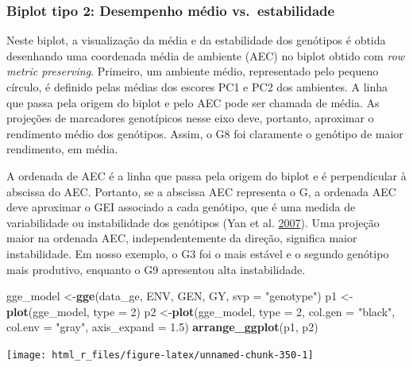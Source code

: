 \documentclass[
]{book}
\newenvironment{Shaded}{\begin{snugshade}}{\end{snugshade}}
\newcommand{\DataTypeTok}[1]{\textcolor[rgb]{0.13,0.29,0.53}{#1}}
\newcommand{\DecValTok}[1]{\textcolor[rgb]{0.00,0.00,0.81}{#1}}
\newcommand{\FloatTok}[1]{\textcolor[rgb]{0.00,0.00,0.81}{#1}}
\newcommand{\KeywordTok}[1]{\textcolor[rgb]{0.13,0.29,0.53}{\textbf{#1}}}
\newcommand{\NormalTok}[1]{#1}
\newcommand{\StringTok}[1]{\textcolor[rgb]{0.31,0.60,0.02}{#1}}
\numberwithin{equation}{section}
\newcommand{\indt}[1]{\index{#1|ST}}
\begin{document}
\hypertarget{biplot-tipo-2-desempenho-muxe9dio-vs.-estabilidade}{%
\subsubsection{Biplot tipo 2: Desempenho médio vs.~estabilidade}\label{biplot-tipo-2-desempenho-muxe9dio-vs.-estabilidade}}

Neste biplot, a visualização da média e da estabilidade dos genótipos é obtida desenhando uma coordenada média de ambiente (AEC) no biplot obtido com \emph{row metric preserving}. Primeiro, um ambiente médio, representado pelo pequeno círculo, é definido pelas médias dos escores PC1 e PC2 dos ambientes. A linha que passa pela origem do biplot e pelo AEC pode ser chamada de média. As projeções de marcadores genotípicos nesse eixo deve, portanto, aproximar o rendimento médio dos genótipos. Assim, o G8 foi claramente o genótipo de maior rendimento, em média.

A ordenada de AEC é a linha que passa pela origem do biplot e é perpendicular à abscissa do AEC. Portanto, se a abscissa AEC representa o G, a ordenada AEC deve aproximar o GEI associado a cada genótipo, que é uma medida de variabilidade ou instabilidade dos genótipos (Yan et al. \protect\hyperlink{ref-Yan2007}{2007}). Uma projeção maior na ordenada AEC, independentemente da direção, significa maior instabilidade. Em nosso exemplo, o G3 foi o mais estável e o segundo genótipo mais produtivo, enquanto o G9 apresentou alta instabilidade.
\indt{biplot}

\begin{Shaded}
\begin{Highlighting}[]
\NormalTok{gge\_model \textless{}{-}}\KeywordTok{gge}\NormalTok{(data\_ge, ENV, GEN, GY, }\DataTypeTok{svp =} \StringTok{"genotype"}\NormalTok{)}
\NormalTok{p1 \textless{}{-}}\KeywordTok{plot}\NormalTok{(gge\_model, }\DataTypeTok{type =} \DecValTok{2}\NormalTok{)}
\NormalTok{p2 \textless{}{-}}\KeywordTok{plot}\NormalTok{(gge\_model,}
          \DataTypeTok{type =} \DecValTok{2}\NormalTok{,}
          \DataTypeTok{col.gen =} \StringTok{"black"}\NormalTok{,}
          \DataTypeTok{col.env =} \StringTok{"gray"}\NormalTok{,}
          \DataTypeTok{axis\_expand =} \FloatTok{1.5}\NormalTok{)}
\KeywordTok{arrange\_ggplot}\NormalTok{(p1, p2)}
\end{Highlighting}
\end{Shaded}

\begin{center}\texttt{[image: html\_r\_files/figure-latex/unnamed-chunk-350-1]} \end{center}
\end{document}
